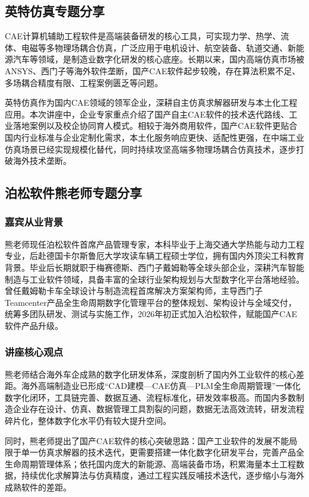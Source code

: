\documentclass[12pt,a4paper]{article}
\begin{document}
\subsection{英特仿真专题分享}
CAE计算机辅助工程软件是高端装备研发的核心工具，可实现力学、热学、流体、电磁等多物理场耦合仿真，广泛应用于电机设计、航空装备、轨道交通、新能源汽车等领域，是制造业数字化研发的核心底座。长期以来，国内高端仿真市场被ANSYS、西门子等海外软件垄断，国产CAE软件起步较晚，存在算法积累不足、多场耦合精度有限、工程案例匮乏等问题。

英特仿真作为国内CAE领域的领军企业，深耕自主仿真求解器研发与本土化工程应用。本次讲座中，企业专家重点介绍了国产自主CAE软件的技术迭代路线、工业落地案例以及校企协同育人模式。相较于海外商用软件，国产CAE软件更贴合国内行业标准与企业定制化需求，本土化服务响应更快、适配性更强，在中端工业仿真场景已经实现规模化替代，同时持续攻坚高端多物理场耦合仿真技术，逐步打破海外技术垄断。

\subsection{泊松软件熊老师专题分享}
\subsubsection{嘉宾从业背景}
熊老师现任泊松软件首席产品管理专家，本科毕业于上海交通大学热能与动力工程专业，后赴德国卡尔斯鲁厄大学攻读车辆工程硕士学位，拥有国内外顶尖工科教育背景。毕业后长期就职于梅赛德斯、西门子戴姆勒等全球头部企业，深耕汽车智能制造与工业软件领域，具备丰富的全球行业架构规划与大型数字化平台落地经验。曾任戴姆勒卡车全球设计与制造流程首席解决方案架构师，主导西门子Teamcenter产品全生命周期数字化管理平台的整体规划、架构设计与全域交付，统筹多团队研发、测试与实施工作，2026年初正式加入泊松软件，赋能国产CAE软件产品升级。

\subsubsection{讲座核心观点}
熊老师结合海外车企成熟的数字化研发体系，深度剖析了国内外工业软件的核心差距。海外高端制造业已形成“CAD建模—CAE仿真—PLM全生命周期管理”一体化数字化闭环，工具链完善、数据互通、流程标准化，研发效率极高。而国内多数制造企业存在设计、仿真、数据管理工具割裂的问题，数据无法高效流转，研发流程碎片化，整体数字化水平仍有较大提升空间。

同时，熊老师提出了国产CAE软件的核心突破思路：国产工业软件的发展不能局限于单一仿真求解器的技术迭代，更需要搭建一体化数字化研发平台，完善产品全生命周期管理体系；依托国内庞大的新能源、高端装备市场，积累海量本土工程数据，持续优化求解算法与仿真精度，通过工程实践反哺技术迭代，逐步缩小与海外成熟软件的差距。
\end{document}
